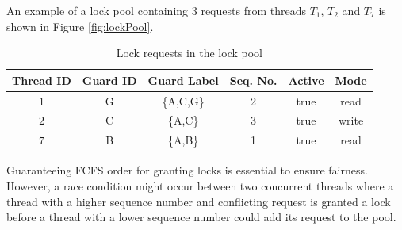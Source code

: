 
An example of a lock pool containing 3 requests from threads $T_1$, $T_2$ and $T_7$ is shown in Figure \ref{fig:lockPool}. 

\begin{table}[H]
	\centering
	\captionsetup{justification=centering}
	\begin{tabular}{cccccc}
		\textbf{Thread ID} & \textbf{Guard ID}& \textbf{Guard Label} & \textbf{Seq. No.} & \textbf{Active} & \textbf{Mode} \\
		\hline
		$1$ & G &\{A,C,G\} & 2 & true & read\\
		$2$ & C &\{A,C\} & 3   & true & write\\
		$7$ & B &\{A,B\} &  1  & true & read\\
	\end{tabular}
	\caption{Lock requests in the lock pool}
	\label{lockPoolTable}
\end{table}



Guaranteeing FCFS order for granting locks is essential to ensure fairness. However, a race condition might occur between two concurrent threads where a thread with a higher sequence number and conflicting request is granted a lock before a thread with a lower sequence number could add its request to the pool. 

